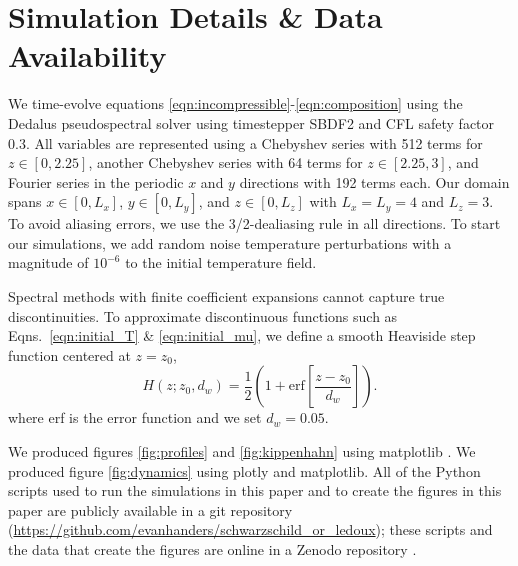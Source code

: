 \section{Simulation Details \& Data Availability}
\label{app:simulation_details}
We time-evolve equations \ref{eqn:incompressible}-\ref{eqn:composition} using the Dedalus pseudospectral solver \citep[git commit 1339061]{burns_etal_2020} using timestepper SBDF2 \citep{wang_ruuth_2008} and CFL safety factor 0.3.
All variables are represented using a Chebyshev series with 512 terms for $z \in [0, 2.25]$, another Chebyshev series with 64 terms for $z \in [2.25, 3]$, and Fourier series in the periodic $x$ and $y$ directions with 192 terms each.
Our domain spans $x \in [0, L_x]$, $y \in [0, L_y]$, and $z \in [0, L_z]$ with $L_x = L_y = 4$ and $L_z = 3$.
To avoid aliasing errors, we use the 3/2-dealiasing rule in all directions.
To start our simulations, we add random noise temperature perturbations with a magnitude of $10^{-6}$ to the initial temperature field.

Spectral methods with finite coefficient expansions cannot capture true discontinuities.
To approximate discontinuous functions such as Eqns.~\ref{eqn:initial_T} \& \ref{eqn:initial_mu}, we define a smooth Heaviside step function centered at $z = z_0$,
\begin{equation}
H(z; z_0, d_w) = \frac{1}{2}\left(1 + \mathrm{erf}\left[\frac{z - z_0}{d_w}\right]\right).
\label{eqn:heaviside}
\end{equation}
where erf is the error function and we set $d_w = 0.05$.

We produced figures \ref{fig:profiles} and \ref{fig:kippenhahn} using matplotlib \citep{hunter2007, mpl3.3.4}.
We produced figure \ref{fig:dynamics} using plotly \citep{plotly} and matplotlib.
All of the Python scripts used to run the simulations in this paper and to create the figures in this paper are publicly available in a git repository (\url{https://github.com/evanhanders/schwarzschild_or_ledoux}); these scripts and the data that create the figures are online in a Zenodo repository \citep{supp}.
